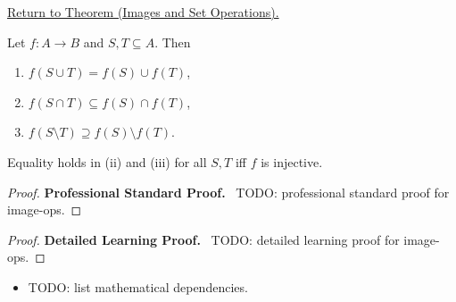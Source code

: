 \newpage
{}
\label{prf:image-ops}

\begin{remark*}[Return]
\hyperref[thm:image-ops]{Return to Theorem (Images and Set Operations).}
\end{remark*}

\begin{theorem*}
Let $f : A \to B$ and $S, T \subseteq A$. Then
\begin{enumerate}[label=(\roman*)]
\item $f(S \cup T) = f(S) \cup f(T)$,
\item $f(S \cap T) \subseteq f(S) \cap f(T)$,
\item $f(S \setminus T) \supseteq f(S) \setminus f(T)$.
\end{enumerate}
Equality holds in (ii) and (iii) for all $S,T$ iff $f$ is injective.
\end{theorem*}

\begin{proof}
\textbf{Professional Standard Proof.}~
TODO: professional standard proof for image-ops.
\end{proof}

\begin{proof}
\textbf{Detailed Learning Proof.}~
TODO: detailed learning proof for image-ops.
\end{proof}

\begin{remark*}
\end{remark*}

\begin{dependencies}
\begin{itemize}
  \item TODO: list mathematical dependencies.
\end{itemize}
\end{dependencies}

\clearpage
